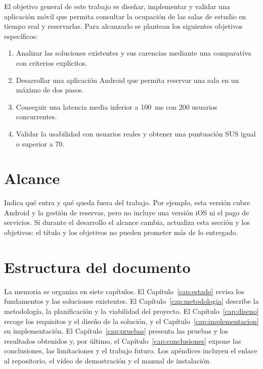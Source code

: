 El objetivo general de este trabajo es diseñar, implementar y validar una
aplicación móvil que permita consultar la ocupación de las salas de estudio en
tiempo real y reservarlas. Para alcanzarlo se plantean los siguientes objetivos
específicos:

\begin{enumerate}[label=\textbf{O\arabic*.}, ref=O\arabic*]
  \item \label{obj:estado} Analizar las soluciones existentes y sus carencias
        mediante una comparativa con criterios explícitos.
  \item \label{obj:app} Desarrollar una aplicación Android que permita reservar
        una sala en un máximo de dos pasos.
  \item \label{obj:rendimiento} Conseguir una latencia media inferior a
        \qty{100}{ms} con 200 usuarios concurrentes.
  \item \label{obj:validacion} Validar la usabilidad con usuarios reales y
        obtener una puntuación \ac{SUS} igual o superior a 70.
\end{enumerate}


\section{Alcance}
\label{sec:alcance}

Indica qué entra y qué queda fuera del trabajo. Por ejemplo, esta versión cubre
Android y la gestión de reservas, pero no incluye una versión iOS ni el pago de
servicios. Si durante el desarrollo el alcance cambia, actualiza esta sección y
los objetivos: el título y los objetivos no pueden prometer más de lo entregado.

\section{Estructura del documento}
\label{sec:estructura}

La memoria se organiza en siete capítulos. El Capítulo~\ref{cap:estado} revisa
los fundamentos y las soluciones existentes. El Capítulo~\ref{cap:metodologia}
describe la metodología, la planificación y la viabilidad del proyecto. El
Capítulo~\ref{cap:diseno} recoge los requisitos y el diseño de la solución, y el
Capítulo~\ref{cap:implementacion} su implementación. El
Capítulo~\ref{cap:pruebas} presenta las pruebas y los resultados obtenidos y,
por último, el Capítulo~\ref{cap:conclusiones} expone las conclusiones, las
limitaciones y el trabajo futuro. Los apéndices incluyen el enlace al
repositorio, el vídeo de demostración y el manual de instalación.

